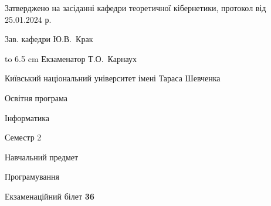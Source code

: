 \documentclass[12pt, ukrainian]{article}
\begin{document}
{\smallskip\smallskip \begin {scriptsize} Затверджено на засіданні кафедри теоретичної кібернетики, протокол   від   25.01.2024 р.\par\smallskip\smallskip\smallskip\smallskip
{\parbox {6.5 cm} {Зав. кафедри \dotfill Ю.В.~Крак}}\hspace {0.7cm} {\hbox to 6.5 cm { Екзаменатор \dotfill Т.О.~Карнаух}} \end{scriptsize}}
\newpage
{{\begin {scriptsize}\par
{ \center  Київський національний університет імені Тараса Шевченка \par}
{\parbox {5 cm}{Освітня програма \hfill}{\parbox {7 cm}{Інформатика\hfill}}\parbox {6 cm}{\hfill Семестр 2}}\par
{\parbox {5 cm} {Навчальний предмет \hfill}\parbox {7 cm}{Програмування \hfill}\parbox {6cm}{\hfill}\par}\vspace{-15pt} \end{scriptsize}}{\center Екзаменаційний білет \No \textbf { 36 }\par}}
\end{document}
